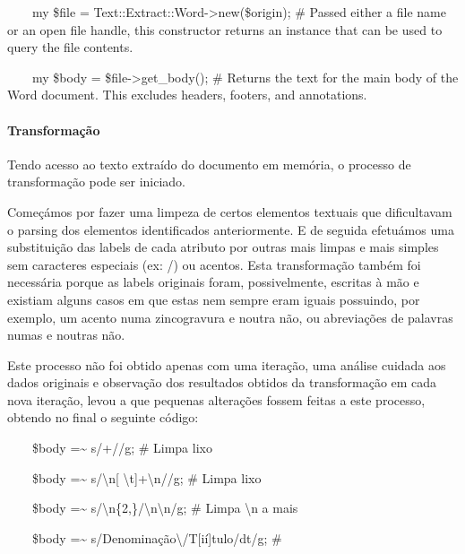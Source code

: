 \documentclass[letterpaper]{article}
\begin{document}
{
\ \ \ \ my \$file = Text::Extract::Word-{\textgreater}new(\$origin); \#
Passed either a file name or an open file handle, this constructor
returns an instance that can be used to query the file contents. }

{
\ \ \ \ my \$body = \$file-{\textgreater}get\_body(); \# Returns the
text for the main body of the Word document. This excludes headers,
footers, and annotations.}


\bigskip

\paragraph[Transforma\c{c}\~ao]{
Transforma\c{c}\~ao}
{
Tendo acesso ao texto extra\'ido do documento em mem\'oria, o processo
de transforma\c{c}\~ao pode ser iniciado.}

{
Come\c{c}\'amos por fazer uma limpeza de certos elementos textuais que
dificultavam o parsing dos elementos identificados anteriormente. E de
seguida efetu\'amos uma substitui\c{c}\~ao das labels de cada atributo
por outras mais limpas e mais simples sem caracteres especiais (ex:
{\textquotesingle}/{\textquotesingle}) ou acentos. Esta
transforma\c{c}\~ao tamb\'em foi necess\'aria porque as labels
originais foram, possivelmente, escritas \`a m\~ao e existiam alguns
casos em que estas nem sempre eram iguais possuindo, por exemplo, um
acento numa zincogravura e noutra n\~ao, ou abrevia\c{c}\~oes de
palavras numas e noutras n\~ao.}

{
Este processo n\~ao foi obtido apenas com uma itera\c{c}\~ao, uma
an\'alise cuidada aos dados originais e observa\c{c}\~ao dos resultados
obtidos da transforma\c{c}\~ao em cada nova itera\c{c}\~ao, levou a que
pequenas altera\c{c}\~oes fossem feitas a este processo, obtendo no
final o seguinte c\'odigo:}

{
\ \ \ \ \$body =\~{} s/{\textasciiacute}+//g; \# Limpa lixo }

{
\ \ \ \ \$body =\~{} s/{\textbackslash}n[
{\textbackslash}t]+{\textbackslash}n//g; \# Limpa lixo }

{
\ \ \ \ \$body =\~{}
s/{\textbackslash}n\{2,\}/{\textbackslash}n{\textbackslash}n/g; \#
Limpa {\textbackslash}n a mais }

{
\ \ \ \ \$body =\~{}
s/Denomina\c{c}\~ao{\textbackslash}/T[i\'i]tulo/dt/g; \# }
\end{document}
